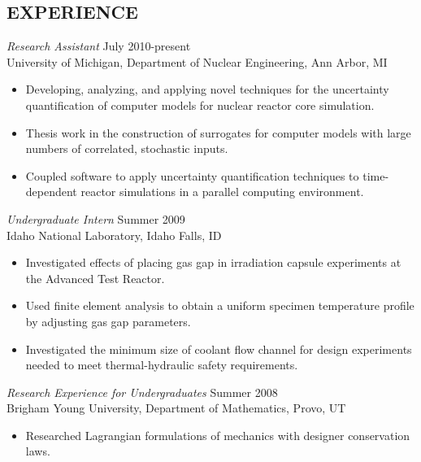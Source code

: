 \documentclass[margin, 10pt]{res} %
\begin{document}
\begin{resume}
 
\section{EXPERIENCE}

{\sl Research Assistant} \hfill July 2010-present \\
University of Michigan, Department of Nuclear Engineering, Ann Arbor, MI

\begin{itemize} \itemsep -2pt %
\item Developing, analyzing, and applying novel techniques for the uncertainty quantification of computer models for nuclear reactor core simulation.
\item Thesis work in the construction of surrogates for computer models with large numbers of correlated, stochastic inputs.  
\item Coupled software to apply uncertainty quantification techniques to time-dependent reactor simulations in a parallel computing environment.  
\end{itemize}

{\sl Undergraduate Intern} \hfill Summer 2009 \\
Idaho National Laboratory, Idaho Falls, ID 

\begin{itemize} \itemsep -2pt %
\item Investigated effects of placing gas gap in irradiation capsule experiments at the Advanced Test Reactor. 
\item Used finite element analysis to obtain a uniform specimen temperature profile by adjusting gas gap parameters.
\item Investigated the minimum size of coolant flow channel for design experiments needed to meet thermal-hydraulic safety requirements.
\end{itemize}
 
{\sl Research Experience for Undergraduates} \hfill Summer 2008 \\
Brigham Young University, Department of Mathematics, Provo, UT 
\begin{itemize} 
\item Researched Lagrangian formulations of mechanics with designer conservation laws. 
\end{itemize} 


\end{resume}
\end{document}
